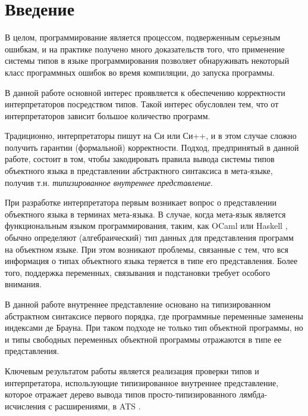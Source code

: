 \section{Введение}
\label{sec:intro}

В целом, программирование является процессом, подверженным серьезным ошибкам, и на практике получено много доказательств того, что применение системы типов в языке программирования позволяет обнаруживать некоторый класс программных ошибок во время компиляции, до запуска программы.

В данной работе основной интерес проявляется к обеспечению корректности интерпретаторов посредством типов. Такой интерес обусловлен тем, что от интерпретаторов зависит большое количество программ.

Традиционно, интерпретаторы пишут на Си или Си++, и в этом случае сложно получить гарантии (формальной) корректности. Подход, предпринятый в данной работе, состоит в том, чтобы закодировать правила вывода системы типов объектного языка в представлении абстрактного синтаксиса в мета-языке, получив т.н. \emph{типизированное внутреннее представление}.

При разработке интерпретатора первым возникает вопрос о представлении объектного языка в терминах мета-языка. В случае, когда мета-язык является функциональным языком программирования, таким, как OCaml \cite{Remy/appsem} или Haskell \cite{hudak2007history}, обычно определяют (алгебраический) тип данных для представления программ на объектном языке. При этом возникают проблемы, связанные с тем, что вся информация о типах объектного языка теряется в типе его представления. Более того, поддержка переменных, связывания и подстановки требует особого внимания.

В данной работе внутреннее представление основано на типизированном абстрактном синтаксисе первого порядка, где программные переменные заменены индексами де Брауна. \cite{de1972lambda,chen2006implementing} При таком подходе не только тип объектной программы, но и типы свободных переменных объектной программы отражаются в типе ее представления.

Ключевым результатом работы является реализация проверки типов и интерпретатора, использующие типизированное внутреннее представление, которое отражает дерево вывода типов просто-типизированного лямбда-исчисления \cite{church1940formulation} с расширениями, в ATS \cite{Xi:2004:TYPES}.

